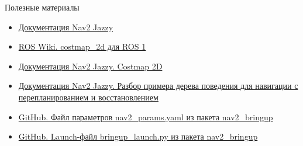 \documentclass[aspectratio=169]{beamer}
\begin{document}
\begin{frame}{Полезные материалы}
\begin{itemize}
  \item \href{https://docs.nav2.org/jazzy/}{Документация Nav2 Jazzy}
  \item \href{https://ftp.osuosl.org/pub/ros/ros_wiki_mirror/costmap_2d.html}{ROS Wiki. costmap\_2d для ROS 1}
  \item \href{https://docs.nav2.org/jazzy/configuration_and_development/configuration_guide/core_servers/costmap_2d/}{Документация Nav2 Jazzy. Costmap 2D}
  
  \item \href{https://docs.nav2.org/jazzy/getting_started/nav2_behavior_trees/detailed_behavior_tree_walkthrough/detailed_behavior_tree_walkthrough/}{Документация Nav2 Jazzy. Разбор примера дерева поведения для навигации с перепланированием и восстановлением}
  \item \href{https://github.com/ros-navigation/navigation2/blob/jazzy/nav2_bringup/params/nav2_params.yaml}{GitHub. Файл параметров nav2\_params.yaml из пакета nav2\_bringup} 
  \item \href{https://github.com/ros-navigation/navigation2/blob/jazzy/nav2_bringup/launch/bringup_launch.py}{GitHub. Launch-файл bringup\_launch.py из пакета nav2\_bringup} 
\end{itemize}
\end{frame}
\end{document}
